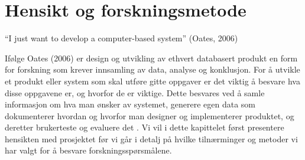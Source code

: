 \chapter{Hensikt og forskningsmetode}
\label{chp:forskningsmetode}

“I just want to develop a computer-based system” (Oates, 2006)

\noindent
Ifølge Oates (2006) er design og utvikling av ethvert databasert produkt en form for forskning som krever innsamling av data, analyse og konklusjon. For å utvikle et produkt eller system som skal utføre gitte oppgaver er det viktig å besvare hva disse oppgavene er, og hvorfor de er viktige. Dette besvares ved å samle informasjon om hva man ønsker av systemet, generere egen data som dokumenterer hvordan og hvorfor man designer og implementerer produktet, og deretter brukerteste og evaluere det \cite{Oates}. Vi vil i dette kapittelet først presentere hensikten med prosjektet før vi går i detalj på hvilke tilnærminger og metoder vi har valgt for å besvare forskningsspørsmålene.

